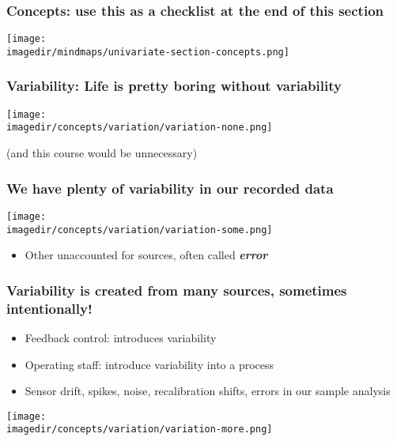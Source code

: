 \begin{frame}\frametitle{Concepts: use this as a checklist at the end of this section}
	\begin{center}
		\texttt{[image: \\imagedir/mindmaps/univariate-section-concepts.png]}
	\end{center}
\end{frame}

\begin{frame}\frametitle{Variability: Life is pretty boring without variability}

	\begin{center}
		\texttt{[image: \\imagedir/concepts/variation/variation-none.png]}
	\end{center}
	(and this course would be unnecessary)
\end{frame}

\begin{frame}\frametitle{We have plenty of variability in our recorded data}

	\begin{center}
		\texttt{[image: \\imagedir/concepts/variation/variation-some.png]}
	\end{center}
	\begin{itemize}
		\item	Other unaccounted for sources, often called \textbf{\emph{error}}
	\end{itemize}
\end{frame}

\begin{frame}\frametitle{Variability is created from many sources, sometimes intentionally!}
	\begin{itemize}
		\item	Feedback control: introduces variability
		\item	Operating staff: introduce variability into a process
		\item	Sensor drift, spikes, noise, recalibration shifts, errors in our sample analysis
	\end{itemize}

	\texttt{[image: \\imagedir/concepts/variation/variation-more.png]}
\end{frame}

